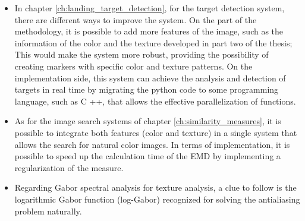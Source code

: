 \begin{itemize}
	\item In chapter \ref{ch:landing_target_detection}, for the target detection system, there are different ways to improve the system. On the part of the methodology, it is possible to add more features of the image, such as the information of the color and the texture developed in part two of the thesis; This would make the system more robust, providing the possibility of creating markers with specific color and texture patterns. On the implementation side, this system can achieve the analysis and detection of targets in real time by migrating the python code to some programming language, such as C ++, that allows the effective parallelization of functions.
	 \item As for the image search systems of chapter \ref{ch:similarity_measures}, it is possible to integrate both features (color and texture) in a single system that allows the search for natural color images. In terms of implementation, it is possible to speed up the calculation time of the EMD by implementing a regularization of the measure.
	 \item Regarding Gabor spectral analysis for texture analysis, a clue to follow is the logarithmic Gabor function (log-Gabor) recognized for solving the antialiasing problem naturally.
\end{itemize}

